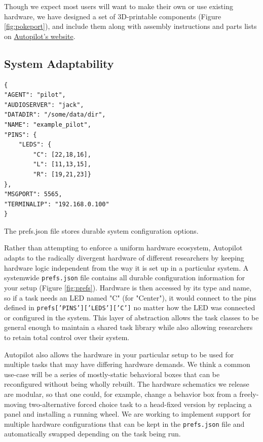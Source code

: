 \documentclass[nohyper, justified, notitlepage, marginals=raggedright,twoside=false,debug]{tufte-autopilot}
\begin{document}
Though we expect most users will want to make their own or use existing hardware, we have designed a set of 3D-printable components (Figure \ref{fig:pokeport}), and include them along with assembly instructions and parts lists on \href{https://auto-pi-lot.com/hardware/}{Autopilot's website}. 
\clearpage

\subsection{System Adaptability}

\begin{marginfigure}[0.4cm]
\begin{verbatim}
{
"AGENT": "pilot",
"AUDIOSERVER": "jack",
"DATADIR": "/some/data/dir",
"NAME": "example_pilot",
"PINS": {
    "LEDS": {
        "C": [22,18,16],
        "L": [11,13,15],
        "R": [19,21,23]}
},
"MSGPORT": 5565,
"TERMINALIP": "192.168.0.100"
}
\end{verbatim}
\caption{The prefs.json file stores durable system configuration options.}
\label{fig:prefs}
\end{marginfigure}%

Rather than attempting to enforce a uniform hardware ecosystem, Autopilot adapts to the radically divergent hardware of different researchers by keeping hardware logic independent from the way it is set up in a particular system. A systemwide \texttt{prefs.json} file contains all durable configuration information for your setup (Figure \ref{fig:prefs}). Hardware is then accessed by its type and name, so if a task needs an LED named "C" (for "Center"), it would connect to the pins defined in  \texttt{prefs['PINS']['LEDS']['C']} no matter how the LED was connected or configured in the system. This layer of abstraction allows the task classes to be general enough to maintain a shared task library while also allowing researchers to retain total control over their system. 
 
Autopilot also allows the hardware in your particular setup to be used for multiple tasks that may have differing hardware demands. We think a common use-case will be a series of mostly-static behavioral boxes that can be reconfigured without being wholly rebuilt. The hardware schematics we release are modular, so that one could, for example, change a behavior box from a freely-moving two-alternative forced choice task to a head-fixed version by replacing a panel and installing a running wheel. We are working to implement support for multiple hardware configurations that can be kept in the \texttt{prefs.json} file and automatically swapped depending on the task being run.
\end{document}
